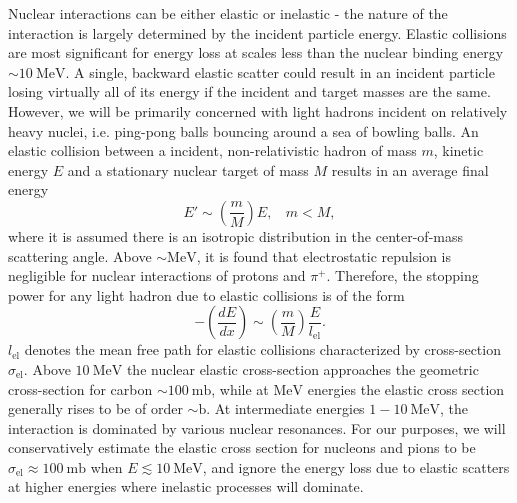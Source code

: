 \documentclass[twocolumn,showpacs,preprintnumbers,amsmath,amssymb,prd]{revtex4}
\newcommand{\MeV}{\text{MeV}}
\def\r{\right)}
\def\l{\left(}
\begin{document}
\begin{appendices}
Nuclear interactions can be either elastic or inelastic - the nature of the interaction is largely determined by the incident particle energy. 
Elastic collisions are most significant for energy loss at scales less than the nuclear binding energy $\sim 10 ~\text{MeV}$.
A single, backward elastic scatter could result in an incident particle losing virtually all of its energy if the incident and target masses are the same.
However, we will be primarily concerned with light hadrons incident on relatively heavy nuclei, i.e. ping-pong balls bouncing around a sea of bowling balls.
An elastic collision between a incident, non-relativistic hadron of mass $m$, kinetic energy $E$ and a stationary nuclear target of mass $M$ results in an average final energy
\begin{equation}
\label{eq:elasticratio}
E' \sim \l \frac{m}{M}\r E, ~~~~ m < M,
\end{equation}
where it is assumed there is an isotropic distribution in the center-of-mass scattering angle.
Above $\sim \text{MeV}$, it is found that electrostatic repulsion is negligible for nuclear interactions of protons and $\pi^+$. 
Therefore, the stopping power for any light hadron due to elastic collisions is of the form
\begin{equation}
- \l \frac{dE}{dx} \r \sim \l \frac{m}{M} \r \frac{E}{l_\text{el}}. 
\end{equation}
$l_\text{el}$ denotes the mean free path for elastic collisions characterized by cross-section $\sigma_\text{el}$. 
Above $10 ~\MeV$ the nuclear elastic cross-section approaches the geometric cross-section for carbon $\sim 100 ~\text{mb}$, while at $\MeV$ energies the elastic cross section generally rises to be of order $\sim \text{b}$. 
At intermediate energies $1 - 10 ~\MeV$, the interaction is dominated by various nuclear resonances. 
For our purposes, we will conservatively estimate the elastic cross section for nucleons and pions to be $\sigma_\text{el} \approx 100 ~\text{mb}$ when $E \lesssim 10 ~\MeV$, and ignore the energy loss due to elastic scatters at higher energies where inelastic processes will dominate. 


\end{appendices}
\end{document}
